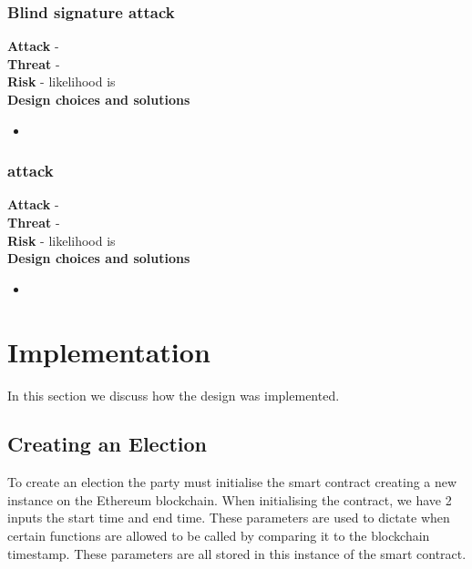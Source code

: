 \documentclass{entcs}
\begin{document}
\subsubsection{Blind signature attack}
\textbf{Attack} - \\
\textbf{Threat} - \\
\textbf{Risk} - likelihood is \\
\textbf{Design choices and solutions}\\
\begin{itemize}
    \item 
\end{itemize}

\subsubsection{attack}
\textbf{Attack} - \\
\textbf{Threat} - \\
\textbf{Risk} - likelihood is \\
\textbf{Design choices and solutions}\\
\begin{itemize}
    \item 
\end{itemize}



\section{Implementation}
In this section we discuss how the design was implemented.

\subsection{Creating an Election}

To create an election the party must initialise the smart contract creating a new instance on the Ethereum blockchain. When initialising the contract, we have 2 inputs the start time and end time. These parameters are used to dictate when certain functions are allowed to be called by comparing it to the blockchain timestamp. These parameters are all stored in this instance of the smart contract.
\end{document}
